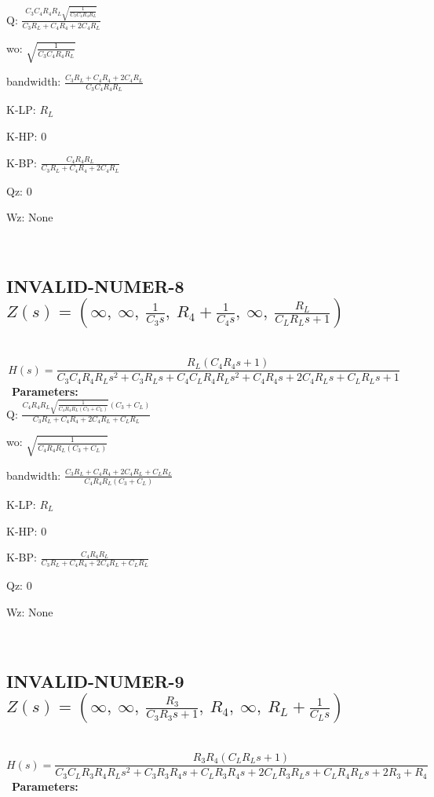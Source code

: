 \documentclass{article}
\begin{document}
Q: $\frac{C_{3} C_{4} R_{4} R_{L} \sqrt{\frac{1}{C_{3} C_{4} R_{4} R_{L}}}}{C_{3} R_{L} + C_{4} R_{4} + 2 C_{4} R_{L}}$\ 

wo: $\sqrt{\frac{1}{C_{3} C_{4} R_{4} R_{L}}}$\ 

bandwidth: $\frac{C_{3} R_{L} + C_{4} R_{4} + 2 C_{4} R_{L}}{C_{3} C_{4} R_{4} R_{L}}$\ 

K-LP: $R_{L}$\ 

K-HP: $0$\ 

K-BP: $\frac{C_{4} R_{4} R_{L}}{C_{3} R_{L} + C_{4} R_{4} + 2 C_{4} R_{L}}$\ 

Qz: $0$\ 

Wz: $\text{None}$\ 

\ 

\subsection{INVALID-NUMER-8 $Z(s) = \left( \infty, \  \infty, \  \frac{1}{C_{3} s}, \  R_{4} + \frac{1}{C_{4} s}, \  \infty, \  \frac{R_{L}}{C_{L} R_{L} s + 1}\right)$ } \ 
\textbf{\[H(s) = \frac{R_{L} \left(C_{4} R_{4} s + 1\right)}{C_{3} C_{4} R_{4} R_{L} s^{2} + C_{3} R_{L} s + C_{4} C_{L} R_{4} R_{L} s^{2} + C_{4} R_{4} s + 2 C_{4} R_{L} s + C_{L} R_{L} s + 1}\] } \ 
\textbf{Parameters:}\\ 

Q: $\frac{C_{4} R_{4} R_{L} \sqrt{\frac{1}{C_{4} R_{4} R_{L} \left(C_{3} + C_{L}\right)}} \left(C_{3} + C_{L}\right)}{C_{3} R_{L} + C_{4} R_{4} + 2 C_{4} R_{L} + C_{L} R_{L}}$\ 

wo: $\sqrt{\frac{1}{C_{4} R_{4} R_{L} \left(C_{3} + C_{L}\right)}}$\ 

bandwidth: $\frac{C_{3} R_{L} + C_{4} R_{4} + 2 C_{4} R_{L} + C_{L} R_{L}}{C_{4} R_{4} R_{L} \left(C_{3} + C_{L}\right)}$\ 

K-LP: $R_{L}$\ 

K-HP: $0$\ 

K-BP: $\frac{C_{4} R_{4} R_{L}}{C_{3} R_{L} + C_{4} R_{4} + 2 C_{4} R_{L} + C_{L} R_{L}}$\ 

Qz: $0$\ 

Wz: $\text{None}$\ 

\ 

\subsection{INVALID-NUMER-9 $Z(s) = \left( \infty, \  \infty, \  \frac{R_{3}}{C_{3} R_{3} s + 1}, \  R_{4}, \  \infty, \  R_{L} + \frac{1}{C_{L} s}\right)$ } \ 
\textbf{\[H(s) = \frac{R_{3} R_{4} \left(C_{L} R_{L} s + 1\right)}{C_{3} C_{L} R_{3} R_{4} R_{L} s^{2} + C_{3} R_{3} R_{4} s + C_{L} R_{3} R_{4} s + 2 C_{L} R_{3} R_{L} s + C_{L} R_{4} R_{L} s + 2 R_{3} + R_{4}}\] } \ 
\textbf{Parameters:}\\ 
\end{document}
